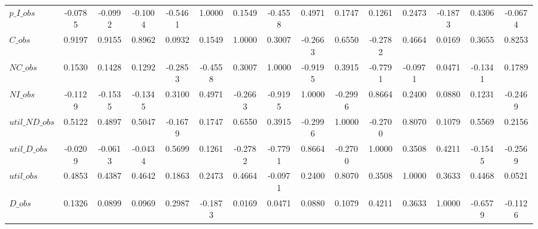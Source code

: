 \begin{center}
\begin{longtable}{lcccccccccccccc}
$p\_I\_obs      $	 & 	          -0.0785	 & 	          -0.0992	 & 	          -0.1004	 & 	          -0.5461	 & 	           1.0000	 & 	           0.1549	 & 	          -0.4558	 & 	           0.4971	 & 	           0.1747	 & 	           0.1261	 & 	           0.2473	 & 	          -0.1873	 & 	           0.4306	 & 	          -0.0674 \\ 
$C\_obs         $	 & 	           0.9197	 & 	           0.9155	 & 	           0.8962	 & 	           0.0932	 & 	           0.1549	 & 	           1.0000	 & 	           0.3007	 & 	          -0.2663	 & 	           0.6550	 & 	          -0.2782	 & 	           0.4664	 & 	           0.0169	 & 	           0.3655	 & 	           0.8253 \\ 
$NC\_obs        $	 & 	           0.1530	 & 	           0.1428	 & 	           0.1292	 & 	          -0.2853	 & 	          -0.4558	 & 	           0.3007	 & 	           1.0000	 & 	          -0.9195	 & 	           0.3915	 & 	          -0.7791	 & 	          -0.0971	 & 	           0.0471	 & 	          -0.1341	 & 	           0.1789 \\ 
$NI\_obs        $	 & 	          -0.1129	 & 	          -0.1535	 & 	          -0.1345	 & 	           0.3100	 & 	           0.4971	 & 	          -0.2663	 & 	          -0.9195	 & 	           1.0000	 & 	          -0.2996	 & 	           0.8664	 & 	           0.2400	 & 	           0.0880	 & 	           0.1231	 & 	          -0.2469 \\ 
$util\_ND\_obs  $	 & 	           0.5122	 & 	           0.4897	 & 	           0.5047	 & 	          -0.1679	 & 	           0.1747	 & 	           0.6550	 & 	           0.3915	 & 	          -0.2996	 & 	           1.0000	 & 	          -0.2700	 & 	           0.8070	 & 	           0.1079	 & 	           0.5569	 & 	           0.2156 \\ 
$util\_D\_obs   $	 & 	          -0.0209	 & 	          -0.0613	 & 	          -0.0434	 & 	           0.5699	 & 	           0.1261	 & 	          -0.2782	 & 	          -0.7791	 & 	           0.8664	 & 	          -0.2700	 & 	           1.0000	 & 	           0.3508	 & 	           0.4211	 & 	          -0.1545	 & 	          -0.2569 \\ 
$util\_obs      $	 & 	           0.4853	 & 	           0.4387	 & 	           0.4642	 & 	           0.1863	 & 	           0.2473	 & 	           0.4664	 & 	          -0.0971	 & 	           0.2400	 & 	           0.8070	 & 	           0.3508	 & 	           1.0000	 & 	           0.3633	 & 	           0.4468	 & 	           0.0521 \\ 
$D\_obs         $	 & 	           0.1326	 & 	           0.0899	 & 	           0.0969	 & 	           0.2987	 & 	          -0.1873	 & 	           0.0169	 & 	           0.0471	 & 	           0.0880	 & 	           0.1079	 & 	           0.4211	 & 	           0.3633	 & 	           1.0000	 & 	          -0.6579	 & 	          -0.1126 \\ 

\end{longtable}
\end{center}
